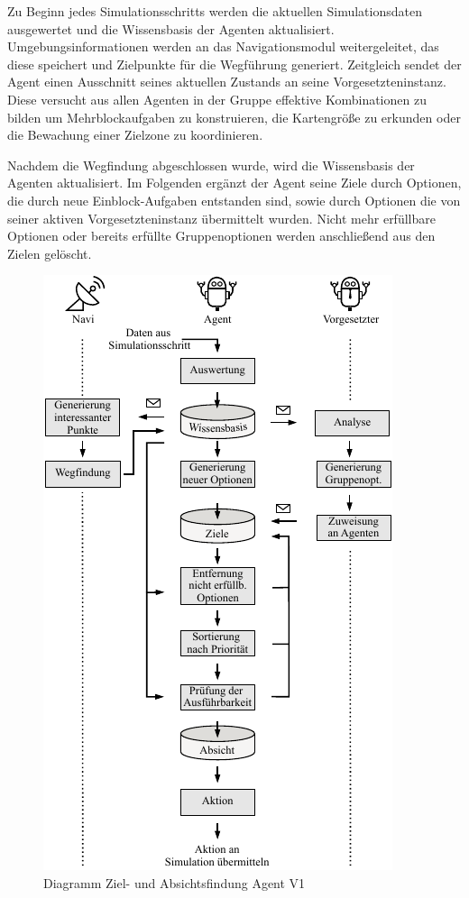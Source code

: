 \documentclass[runningheads]{llncs}
\begin{document}
Zu Beginn jedes Simulationsschritts werden die aktuellen Simulationsdaten ausgewertet und die Wissensbasis der Agenten aktualisiert. Umgebungsinformationen werden an das Navigationsmodul weitergeleitet, das diese speichert und Zielpunkte für die Wegführung generiert. Zeitgleich sendet der Agent einen Ausschnitt seines aktuellen Zustands an seine Vorgesetzteninstanz. Diese versucht aus allen Agenten in der Gruppe effektive Kombinationen zu bilden um Mehrblockaufgaben zu konstruieren, die Kartengröße zu erkunden oder die Bewachung einer Zielzone zu koordinieren.


Nachdem die Wegfindung abgeschlossen wurde, wird die Wissensbasis der Agenten aktualisiert. Im Folgenden ergänzt der Agent seine Ziele durch Optionen, die durch neue Einblock-Aufgaben entstanden sind, sowie durch Optionen die von seiner aktiven Vorgesetzteninstanz übermittelt wurden. Nicht mehr erfüllbare Optionen oder bereits erfüllte Gruppenoptionen werden anschließend aus den Zielen gelöscht.

\begin{figure}
\includegraphics[scale=0.8]{./Referenzen/Entscheidungsfindung.pdf}
\caption{Diagramm Ziel- und Absichtsfindung Agent V1}
\label{desires}
\end{figure}
\end{document}
